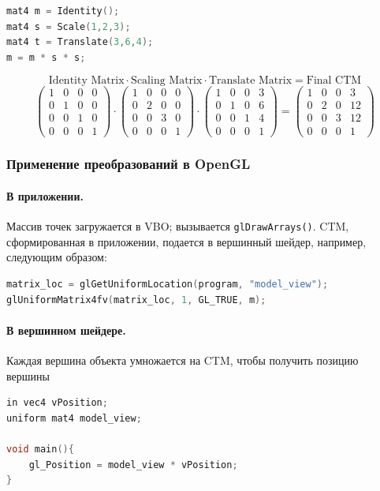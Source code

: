 \documentclass[a4paper, 14pt]{extarticle}
\begin{document}
\begin{lstlisting}[language=C]
mat4 m = Identity();
mat4 s = Scale(1,2,3);
mat4 t = Translate(3,6,4);
m = m * s * s;
\end{lstlisting}
$$\textrm{Identity Matrix} \cdot \textrm{Scaling Matrix} \cdot \textrm{Translate Matrix} = \textrm{Final CTM}$$
$$
\begin{pmatrix}
1 & 0 & 0 & 0\\
0 & 1 & 0 & 0\\
0 & 0 & 1 & 0\\
0 & 0 & 0 & 1
\end{pmatrix}
\cdot
\begin{pmatrix}
1 & 0 & 0 & 0\\
0 & 2 & 0 & 0\\
0 & 0 & 3 & 0\\
0 & 0 & 0 & 1
\end{pmatrix}
\cdot
\begin{pmatrix}
1 & 0 & 0 & 3\\
0 & 1 & 0 & 6\\
0 & 0 & 1 & 4\\
0 & 0 & 0 & 1
\end{pmatrix}
=
\begin{pmatrix}
1 & 0 & 0 & 3\\
0 & 2 & 0 & 12\\
0 & 0 & 3 & 12\\
0 & 0 & 0 & 1
\end{pmatrix}
$$

\subsubsection{Применение преобразований в OpenGL}
\paragraph{В приложении. }
Массив точек загружается в VBO; вызывается \texttt{glDrawArrays()}. CTM, сформированная в приложении, подается в вершинный шейдер, например, следующим образом:
\begin{lstlisting}[language=C]
matrix_loc = glGetUniformLocation(program, "model_view");
glUniformMatrix4fv(matrix_loc, 1, GL_TRUE, m);
\end{lstlisting}

\paragraph{В вершинном шейдере.} Каждая вершина объекта умножается на CTM, чтобы получить позицию вершины
\begin{lstlisting}[language=C]
in vec4 vPosition;
uniform mat4 model_view;

void main(){
	gl_Position = model_view * vPosition;
}

\end{lstlisting}
\end{document}
